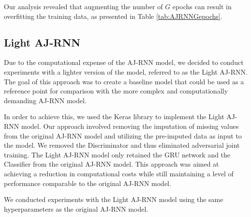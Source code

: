 Our analysis revealed that augmenting the number of $G$ epochs can result in overfitting the training data, as presented in Table \ref{tab:AJRNNGepochs}.


\pagebreak
\subsection{Light AJ-RNN}

Due to the computational expense of the AJ-RNN model, we decided to conduct experiments with a lighter version of the model, referred to as the Light AJ-RNN.
The goal of this approach was to create a baseline model that could be used as a reference point for comparison with the more complex and computationally demanding AJ-RNN model. 

In order to achieve this, we used the Keras library to implement the Light AJ-RNN model.
Our approach involved removing the imputation of missing values from the original AJ-RNN model and utilizing the pre-imputed data as input to the model.
We removed the Discriminator and thus eliminated adversarial joint training.
The Light AJ-RNN model only retained the GRU network and the Classifier from the original AJ-RNN model.
This approach was aimed at achieving a reduction in computational costs while still maintaining a level of performance comparable to the original AJ-RNN model.

We conducted experiments with the Light AJ-RNN model using the same hyperparameters as the original AJ-RNN model.


